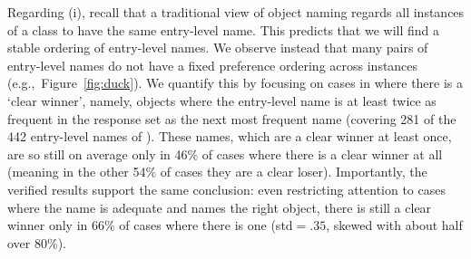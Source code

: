 Regarding (i), recall that a traditional view of object naming regards all instances of a class to have the same entry-level name.
This predicts that we will find a stable ordering of entry-level names. 
We observe instead that many pairs of entry-level names do not have a fixed preference ordering across instances (e.g.,~Figure~\ref{fig:duck}). 
We quantify this by focusing on cases in \mn where there is a `clear winner', namely, objects where the entry-level name is at least twice as frequent in the response set as the next most frequent name (covering 281 of the 442 entry-level names of \mn).
These names, which are a clear winner at least once, are so still on average only in 46\% of cases where there is a clear winner at all (meaning in the other 54\% of cases they are a clear loser).
Importantly, the verified results support the same conclusion: 
even restricting attention to cases where the name is adequate and names the right object, there is still a clear winner only in 66\% of cases where there is one (std\mbox{$=.35$}, skewed with about half over 80\%).


